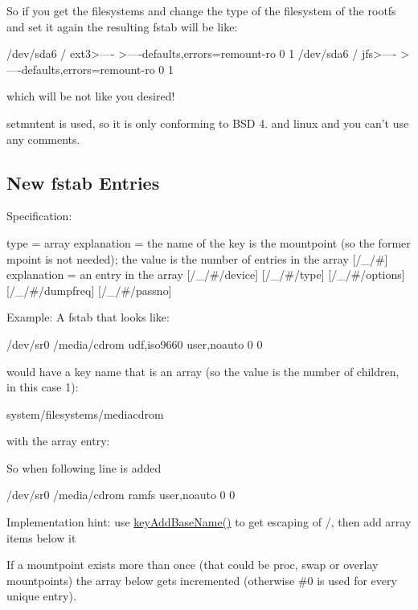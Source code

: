So if you get the filesystems and change the type of the filesystem of the rootfs and set it again the resulting fstab will be like\+: \begin{DoxyVerb}/dev/sda6       /               ext3>----   >----defaults,errors=remount-ro 0 1
/dev/sda6       /               jfs>----   >----defaults,errors=remount-ro 0 1
\end{DoxyVerb}


which will be not like you desired!

setmntent is used, so it is only conforming to B\+S\+D 4. and linux and you can't use any comments.

\subsection*{New fstab Entries}

Specification\+: \begin{DoxyVerb}[/_]
type = array
explanation = the name of the key is the mountpoint (so the former
  mpoint is not needed); the value is the number of entries in the
  array
[/_/#]
explanation = an entry in the array
[/_/#/device]
[/_/#/type]
[/_/#/options]
[/_/#/dumpfreq]
[/_/#/passno]
\end{DoxyVerb}


Example\+: A fstab that looks like\+: \begin{DoxyVerb}/dev/sr0        /media/cdrom   udf,iso9660 user,noauto     0       0
\end{DoxyVerb}


would have a key name that is an array (so the value is the number of children, in this case 1)\+: \begin{DoxyVerb}system/filesystems/\/media\/cdrom
\end{DoxyVerb}


with the array entry\+: 


So when following line is added \begin{DoxyVerb}/dev/sr0        /media/cdrom   ramfs user,noauto     0       0
\end{DoxyVerb}


Implementation hint\+: use {\ttfamily \hyperlink{group__keyname_gaa942091fc4bd5c2699e49ddc50829524}{key\+Add\+Base\+Name()}} to get escaping of {\ttfamily /}, then add array items below it

If a mountpoint exists more than once (that could be proc, swap or overlay mountpoints) the array below gets incremented (otherwise \#0 is used for every unique entry).

